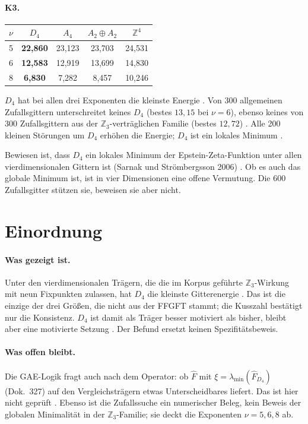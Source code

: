 \paragraph{K3.}
\begin{center}
\begin{tabular}{lcccc}
\toprule
$\nu$ & $D_4$ & $A_4$ & $A_2\oplus A_2$ & $\mathbb{Z}^4$ \\
\midrule
5 & \textbf{22,860} & 23,123 & 23,703 & 24,531 \\
6 & \textbf{12,583} & 12,919 & 13,699 & 14,830 \\
8 & \textbf{6,830} & 7,282 & 8,457 & 10,246 \\
\bottomrule
\end{tabular}
\end{center}
$D_4$ hat bei allen drei Exponenten die kleinste Energie \KM. Von 300
allgemeinen Zufallsgittern unterschreitet keines $D_4$ (bestes $13{,}15$ bei
$\nu=6$), ebenso keines von 300 Zufallsgittern aus der
$\mathbb{Z}_3$-verträglichen Familie (bestes $12{,}72$) \KM. Alle 200 kleinen
Störungen um $D_4$ erhöhen die Energie; $D_4$ ist ein lokales Minimum \KM.

Bewiesen ist, dass $D_4$ ein lokales Minimum der Epstein-Zeta-Funktion unter
allen vierdimensionalen Gittern ist (Sarnak und Strömbergsson 2006) \QM. Ob
es auch das globale Minimum ist, ist in vier Dimensionen eine offene
Vermutung. Die 600 Zufallsgitter stützen sie, beweisen sie aber nicht.

\section{Einordnung}

\paragraph{Was gezeigt ist.}
Unter den vierdimensionalen Trägern, die die im Korpus geführte
$\mathbb{Z}_3$-Wirkung mit neun Fixpunkten zulassen, hat $D_4$ die kleinste
Gitterenergie \KM. Das ist die einzige der drei Größen, die nicht aus der
FFGFT stammt; die Kusszahl bestätigt nur die Konsistenz. $D_4$ ist damit als
Träger besser motiviert als bisher, bleibt aber eine motivierte Setzung
\SetzM. Der Befund ersetzt keinen Spezifitätsbeweis.

\paragraph{Was offen bleibt.}
Die GAE-Logik fragt auch nach dem Operator: ob $\hat F$ mit
$\xi=\lambda_{\min}(\hat F_{D_4})$ (Dok.~327) auf den Vergleichsträgern
etwas Unterscheidbares liefert. Das ist hier nicht geprüft \SM. Ebenso ist
die Zufallssuche ein numerischer Beleg, kein Beweis der globalen Minimalität
in der $\mathbb{Z}_3$-Familie; sie deckt die Exponenten $\nu=5,6,8$ ab.

